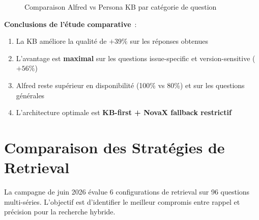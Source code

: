 \begin{figure}[H]
\centering
{}
\caption{Comparaison Alfred vs Persona KB par catégorie de question}
\label{fig:comparative_chart}
\end{figure}

\textbf{Conclusions de l'étude comparative}~:
\begin{enumerate}
  \item La KB améliore la qualité de $+39\%$ sur les réponses obtenues
  \item L'avantage est \textbf{maximal} sur les questions issue-specific et version-sensitive ($+56\%$)
  \item Alfred reste supérieur en disponibilité (100\% vs 80\%) et sur les questions générales
  \item L'architecture optimale est \textbf{KB-first + NovaX fallback restrictif}
\end{enumerate}

\section{Comparaison des Stratégies de Retrieval}
\label{sec:strategies_retrieval}

La campagne de juin 2026 évalue 6 configurations de retrieval sur 96 questions multi-séries. L'objectif est d'identifier le meilleur compromis entre rappel et précision pour la recherche hybride.

